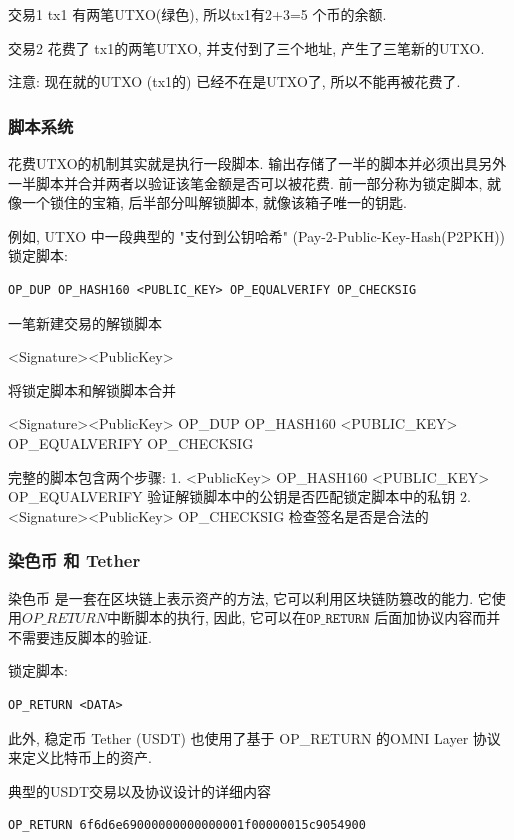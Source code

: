 \documentclass[a4paper,11pt]{article}
\begin{document}
交易1 tx1 有两笔UTXO(绿色), 所以tx1有2+3=5 个币的余额.

交易2 花费了 tx1的两笔UTXO, 并支付到了三个地址, 产生了三笔新的UTXO.

注意: 现在就的UTXO (tx1的) 已经不在是UTXO了, 所以不能再被花费了.

\subsubsection*{脚本系统}

花费UTXO的机制其实就是执行一段脚本. 输出存储了一半的脚本并必须出具另外一半脚本并合并两者以验证该笔金额是否可以被花费. 前一部分称为锁定脚本, 就像一个锁住的宝箱, 后半部分叫解锁脚本, 就像该箱子唯一的钥匙.

例如, UTXO 中一段典型的 "支付到公钥哈希" (Pay-2-Public-Key-Hash(P2PKH)\cite{P2PKH}) 锁定脚本:

\begin{lstlisting}
OP_DUP OP_HASH160 <PUBLIC_KEY> OP_EQUALVERIFY OP_CHECKSIG
\end{lstlisting}

一笔新建交易的解锁脚本

<Signature><PublicKey>

将锁定脚本和解锁脚本合并

<Signature><PublicKey> OP\_DUP OP\_HASH160 <PUBLIC\_KEY> OP\_EQUALVERIFY OP\_CHECKSIG

完整的脚本包含两个步骤:
1. <PublicKey>  OP\_HASH160 <PUBLIC\_KEY> OP\_EQUALVERIFY
	验证解锁脚本中的公钥是否匹配锁定脚本中的私钥
2.  <Signature><PublicKey> OP\_CHECKSIG
	检查签名是否是合法的

\subsubsection*{染色币 和 Tether}

染色币\cite{ColoredCoins} 是一套在区块链上表示资产的方法, 它可以利用区块链防篡改的能力. 它使用${OP\_RETURN}$中断脚本的执行, 因此, 它可以在$\texttt{OP\_RETURN}$ 后面加协议内容而并不需要违反脚本的验证.

锁定脚本:
\begin{lstlisting}
OP_RETURN <DATA>
\end{lstlisting}

此外, 稳定币 Tether\cite{Tether} (USDT) 也使用了基于 OP\_RETURN 的OMNI Layer 协议来定义比特币上的资产.

典型的USDT交易以及协议设计的详细内容

\lstset{basicstyle=\tiny,style=myListStyle}
\begin{lstlisting}
OP_RETURN 6f6d6e69000000000000001f00000015c9054900
\end{lstlisting}
\end{document}

